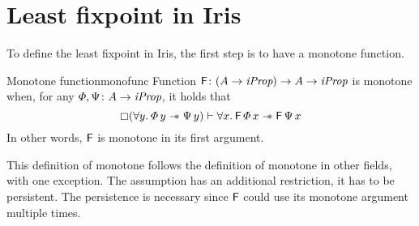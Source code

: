 \documentclass[thesis.tex]{subfiles}
\begin{document}
\section{Least fixpoint in Iris} \label{sec:fixIris}
To define the least fixpoint in Iris, the first step is to have a monotone function.
\begin{definition}{Monotone function}{monofunc}
    Function $\textsf{\upshape F}\colon (A \to \textit{iProp}) \to  A \to \textit{iProp}$ is monotone when, for any $\varPhi, \Psi\colon A \to \textit{iProp}$, it holds that
    \[ \always(\All \varB. \pred\,\varB \wand \predB\,\varB) \proves \All \var. \hopred\,\pred\,\var \wand \hopred\,\predB\,\var\]
    In other words, $\textsf{\upshape F}$ is monotone in its first argument.
\end{definition}
This definition of monotone follows the definition of monotone in other fields, with one exception. The assumption has an additional restriction, it has to be persistent. The persistence is necessary since $\textsf{\upshape F}$ could use its monotone argument multiple times.
\end{document}

